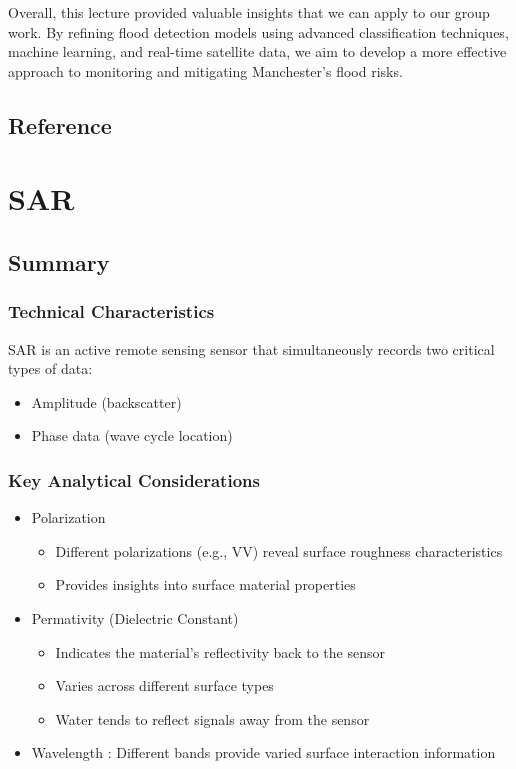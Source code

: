 \documentclass[
  letterpaper,
]{scrbook}
\begin{document}
Overall, this lecture provided valuable insights that we can apply to
our group work. By refining flood detection models using advanced
classification techniques, machine learning, and real-time satellite
data, we aim to develop a more effective approach to monitoring and
mitigating Manchester's flood risks.

\section{Reference}\label{reference-5}


\chapter{SAR}\label{sar}

\section{Summary}\label{summary-6}

\subsection{Technical Characteristics}\label{technical-characteristics}

SAR is an active remote sensing sensor that simultaneously records two
critical types of data:

\begin{itemize}
\item
  Amplitude (backscatter)
\item
  Phase data (wave cycle location)
\end{itemize}

\subsection{Key Analytical
Considerations}\label{key-analytical-considerations}

\begin{itemize}
\item
  Polarization

  \begin{itemize}
  \item
    Different polarizations (e.g., VV) reveal surface roughness
    characteristics
  \item
    Provides insights into surface material properties
  \end{itemize}
\item
  Permativity (Dielectric Constant)

  \begin{itemize}
  \item
    Indicates the material's reflectivity back to the sensor
  \item
    Varies across different surface types
  \item
    Water tends to reflect signals away from the sensor
  \end{itemize}
\item
  Wavelength : Different bands provide varied surface interaction
  information
\end{itemize}
\end{document}

